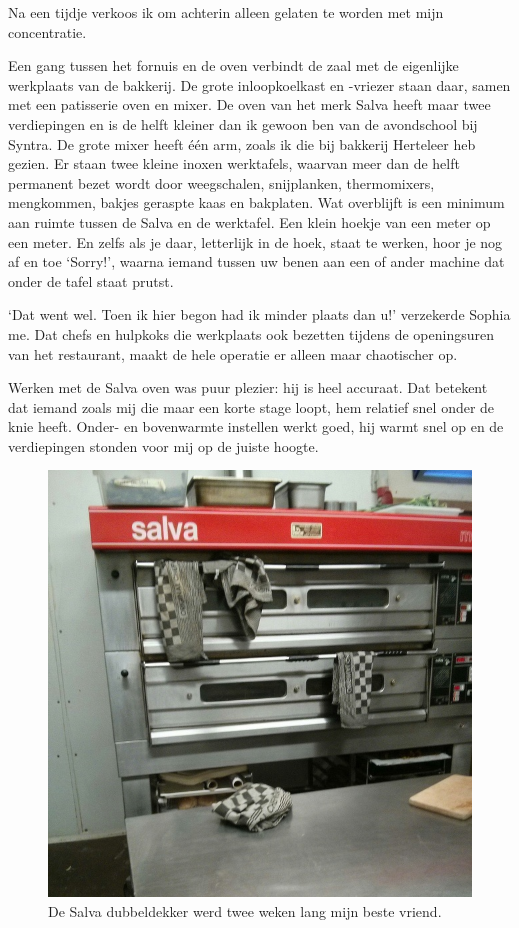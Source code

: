 \documentclass[
  11pt,
  dutch,
]{memoir}
\begin{document}
Na een tijdje verkoos ik om achterin alleen gelaten te worden met mijn
concentratie.

Een gang tussen het fornuis en de oven verbindt de zaal met de
eigenlijke werkplaats van de bakkerij. De grote inloopkoelkast en
-vriezer staan daar, samen met een patisserie oven en mixer. De oven van
het merk Salva heeft maar twee verdiepingen en is de helft kleiner dan
ik gewoon ben van de avondschool bij Syntra. De grote mixer heeft één
arm, zoals ik die bij bakkerij Herteleer heb gezien. Er staan twee
kleine inoxen werktafels, waarvan meer dan de helft permanent bezet
wordt door weegschalen, snijplanken, thermomixers, mengkommen, bakjes
geraspte kaas en bakplaten. Wat overblijft is een minimum aan ruimte
tussen de Salva en de werktafel. Een klein hoekje van een meter op een
meter. En zelfs als je daar, letterlijk in de hoek, staat te werken,
hoor je nog af en toe `Sorry!', waarna iemand tussen uw benen aan een of
ander machine dat onder de tafel staat prutst.

`Dat went wel. Toen ik hier begon had ik minder plaats dan u!'
verzekerde Sophia me. Dat chefs en hulpkoks die werkplaats ook bezetten
tijdens de openingsuren van het restaurant, maakt de hele operatie er
alleen maar chaotischer op.

Werken met de Salva oven was puur plezier: hij is heel accuraat. Dat
betekent dat iemand zoals mij die maar een korte stage loopt, hem
relatief snel onder de knie heeft. Onder- en bovenwarmte instellen werkt
goed, hij warmt snel op en de verdiepingen stonden voor mij op de juiste
hoogte.

\begin{figure}
    \centering
    \includegraphics{img/bw/salva.jpg}
    \caption[De Salva dubbeldekker oven.]{De Salva dubbeldekker werd twee weken lang mijn beste vriend.}
\end{figure}
\end{document}
